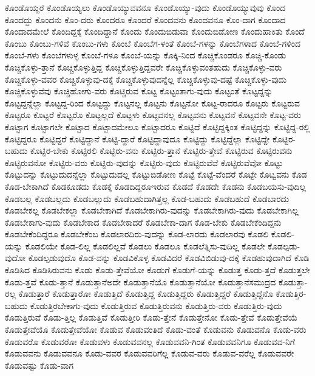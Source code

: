 {ಕೊಂಡೊಯ್ದರೆ
ಕೊಂಡೊಯ್ಯಲು
ಕೊಂಡೊಯ್ಯುವವನೂ
ಕೊಂಡೊಯ್ಯು-ವುದು
ಕೊಂಡೊಯ್ಯುವುವು
ಕೊಂದ
ಕೊಂದದ್ದು
ಕೊಂದನು
ಕೊಂ-ದರು
ಕೊಂದರೂ
ಕೊಂದರೆ
ಕೊಂದವನು
ಕೊಂದವನೂ
ಕೊಂ-ದಾಗ
ಕೊಂದಾದ
ಕೊಂದಾದಮೇಲೆ
ಕೊಂದಿದ್ದಕ್ಕೆ
ಕೊಂದಿದ್ದಾನೆ
ಕೊಂದು
ಕೊಂದುಬಿಡುವಾ
ಕೊಂದುಬಿಡೋಣ
ಕೊಂದುಹಾಕಿತು
ಕೊಂದೆ
ಕೊಂಬು
ಕೊಂಬು-ಗಳಿವೆ
ಕೊಂಬು-ಗಳು
ಕೊಂಬೆ
ಕೊಂಬೆಗ-ಳಂತೆ
ಕೊಂಬೆ-ಗಳನ್ನು
ಕೊಂಬೆಗಳಾದ
ಕೊಂಬೆ-ಗಳಿಂದ
ಕೊಂಬೆ-ಗಳು
ಕೊಂಬೆಗಳುಳ್ಳ
ಕೊಂಬೆ-ಗಳೂ
ಕೊಂಬೆ-ಯನ್ನು
ಕೊಕ್ಕಿ-ನಿಂದ
ಕೊಚ್ಚಿಕೊಂಡರೂ
ಕೊಚ್ಚಿ-ಕೊಂಡು
ಕೊಚ್ಚಿಕೊಳ್ಳು-ತ್ತಾನೆ
ಕೊಚ್ಚಿಕೊಳ್ಳುತ್ತಿದ್ದ
ಕೊಚ್ಚಿಕೊಳ್ಳುತ್ತಿದ್ದವರೇ
ಕೊಚ್ಚಿಕೊಳ್ಳುವಂತಹುದು
ಕೊಚ್ಚಿಕೊಳ್ಳು-ವರು
ಕೊಚ್ಚಿಕೊಳ್ಳು-ವವರ
ಕೊಚ್ಚಿಕೊಳ್ಳುವು-ದಕ್ಕೆ
ಕೊಚ್ಚಿಕೊಳ್ಳುವುದನ್ನೆಲ್ಲ
ಕೊಚ್ಚಿಕೊಳ್ಳುವು-ದಷ್ಟೆ
ಕೊಚ್ಚಿಕೊಳ್ಳು-ವುದು
ಕೊಚ್ಚಿಕೊಳ್ಳುವೆವು
ಕೊಚ್ಚಿಹೋಗು-ವರು
ಕೊಟ್ಚಿರುವ
ಕೊಟ್ಟ
ಕೊಟ್ಟಂತಾಗು-ವುದು
ಕೊಟ್ಟಂತೆ
ಕೊಟ್ಟದ್ದನ್ನು
ಕೊಟ್ಟದ್ದನ್ನೆಲ್ಲಾ
ಕೊಟ್ಟದ್ದ-ರಿಂದ
ಕೊಟ್ಟದ್ದು
ಕೊಟ್ಟನಲ್ಲ
ಕೊಟ್ಟನು
ಕೊಟ್ಟನೋ
ಕೊಟ್ಟ-ರಾದರೂ
ಕೊಟ್ಟರು
ಕೊಟ್ಟರುವ
ಕೊಟ್ಟರೂ
ಕೊಟ್ಟರೆ
ಕೊಟ್ಟರೊ
ಕೊಟ್ಟಲ್ಲದೆ
ಕೊಟ್ಟಳು
ಕೊಟ್ಟವನಲ್ಲ
ಕೊಟ್ಟವನು
ಕೊಟ್ಟವನೆ
ಕೊಟ್ಟವನೇ
ಕೊಟ್ಟ-ವರು
ಕೊಟ್ಟಾಗ
ಕೊಟ್ಟಾಗಲೇ
ಕೊಟ್ಟಾದ
ಕೊಟ್ಟಾದಮೇಲೂ
ಕೊಟ್ಟಾದರೂ
ಕೊಟ್ಟಿದೆ
ಕೊಟ್ಟಿದ್ದಕ್ಕಿಂತ
ಕೊಟ್ಟಿದ್ದನ್ನು
ಕೊಟ್ಟಿದ್ದ-ರಲ್ಲಿ
ಕೊಟ್ಟಿದ್ದರೂ
ಕೊಟ್ಟಿದ್ದರೆ
ಕೊಟ್ಟಿದ್ದಾನೆ
ಕೊಟ್ಟಿ-ದ್ದಾರೆ
ಕೊಟ್ಟಿದ್ದಾವುದೂ
ಕೊಟ್ಟಿದ್ದು
ಕೊಟ್ಟಿದ್ದೆಲ್ಲಾ
ಕೊಟ್ಟಿದ್ದೇ
ಕೊಟ್ಟಿರ-ಬಹುದು
ಕೊಟ್ಟಿರ-ಬೇಕು
ಕೊಟ್ಟಿರಲಿ
ಕೊಟ್ಟಿರು-ವನು
ಕೊಟ್ಟಿರು-ತ್ತಾನೆ
ಕೊಟ್ಟಿರು-ತ್ತೇವೆ
ಕೊಟ್ಟಿರುವ
ಕೊಟ್ಟಿರುವನು
ಕೊಟ್ಟಿರುವನೋ
ಕೊಟ್ಟಿರು-ವರು
ಕೊಟ್ಟಿರು-ವುದನ್ನು
ಕೊಟ್ಟಿರು-ವುದು
ಕೊಟ್ಟಿರುವೆವೆ
ಕೊಟ್ಟಿರುವೆವೋ
ಕೊಟ್ಟು
ಕೊಟ್ಟುದನ್ನು
ಕೊಟ್ಟುದುದನ್ನೆಲ್ಲಾ
ಕೊಟ್ಟುದುದಲ್ಲ
ಕೊಟ್ಟುಬಿಡೋಣ
ಕೊಟ್ಟೆ
ಕೊಟ್ಟೆ-ವೆಂದರೆ
ಕೊಟ್ಟೇ
ಕೊಟ್ವವನು
ಕೊಡ
ಕೊಡ-ಬೇಕಾಗಿದೆ
ಕೊಡಕೂಡದು
ಕೊಡಕ್ಕೆ
ಕೊಡದಿದ್ದರೂಇರುವ
ಕೊಡದೆ
ಕೊಡದೇ
ಕೊಡನು
ಕೊಡಬಯಸು-ವುದಿಲ್ಲ
ಕೊಡಬಲ್ಲ
ಕೊಡಬಲ್ಲದು
ಕೊಡಬಲ್ಲುದು
ಕೊಡಬಹುದಾಗಿತ್ತಲ್ಲ
ಕೊಡ-ಬಹುದು
ಕೊಡಬಹುದೆ
ಕೊಡಬಾರದು
ಕೊಡಬೇಕಲ್ಲ
ಕೊಡಬೇಕಲ್ಲಾ
ಕೊಡಬೇಕಾಗಿದೆ
ಕೊಡಬೇಕಾಗಿರು-ವುದನ್ನು
ಕೊಡಬೇಕಾಗಿರು-ವುದು
ಕೊಡಬೇಕಾಗಿಲ್ಲ
ಕೊಡಬೇಕಾಗು-ವುದು
ಕೊಡಬೇಕಾದ
ಕೊಡಬೇಕಾದರೆ
ಕೊಡಬೇಕಾ-ದಾಗ
ಕೊಡ-ಬೇಕು
ಕೊಡಬೇಕೆಂದಿದ್ದನು
ಕೊಡಬೇಕೆಂದಿದ್ದರೂ
ಕೊಡಬೇಕೆಂಬ
ಕೊಡಲಾರದಿರು-ವುದನ್ನು
ಕೊಡ-ಲಾರದು
ಕೊಡಲಾರವು
ಕೊಡಲಿ
ಕೊಡಲಿ-ಯನ್ನು
ಕೊಡಲಿಯೇ
ಕೊಡ-ಲಿಲ್ಲ
ಕೊಡಲಿಲ್ಲವೆ
ಕೊಡಲು
ಕೊಡಲೂ
ಕೊಡಲೆತ್ನಿಸು-ವುದಿಲ್ಲ
ಕೊಡಲೇ
ಕೊಡಲ್ಪಡು-ವುದೋ
ಕೊಡಲ್ಪಡುವುದೊ
ಕೊಡ-ವನ್ನು
ಕೊಡವಿಕೊಳ್ಳ
ಕೊಡವಿದರೆ
ಕೊಡವಿಬಿಡುವು-ದಕ್ಕೆ
ಕೊಡಹುವುದಾಗಿದೆ
ಕೊಡಿ
ಕೊಡಿಸಿದ
ಕೊಡಿಸಿರುವನು
ಕೊಡು
ಕೊಡು-ತ್ತೇವೆಯೋ
ಕೊಡುಗೆ
ಕೊಡುಗೆ-ಯನ್ನು
ಕೊಡುತ್ತ
ಕೊಡು-ತ್ತದೆ
ಕೊಡುತ್ತಲೇ
ಕೊಡು-ತ್ತವೆ
ಕೊಡು-ತ್ತಾನೆ
ಕೊಡುತ್ತಾನೆಅದೇ
ಕೊಡುತ್ತಾನೆಯೊ
ಕೊಡುತ್ತಾನೆಯೋ
ಕೊಡುತ್ತಾನೆಸಮುದ್ರದ
ಕೊಡುತ್ತಾ-ರಲ್ಲ
ಕೊಡುತ್ತಾರೆ
ಕೊಡುತ್ತಾರೋ
ಕೊಡುತ್ತಿದೆ
ಕೊಡುತ್ತಿದ್ದ
ಕೊಡುತ್ತಿದ್ದರು
ಕೊಡುತ್ತಿದ್ದರೆ
ಕೊಡುತ್ತಿದ್ದೆನೊ
ಕೊಡುತ್ತಿರ-ಬಹುದು
ಕೊಡುತ್ತಿರಬೇಕಾಗು-ವುದು
ಕೊಡುತ್ತಿರುವ
ಕೊಡುತ್ತಿರುವನು
ಕೊಡುತ್ತಿರು-ವರು
ಕೊಡುತ್ತಿರು-ವುದು
ಕೊಡುತ್ತಿರುವೆ
ಕೊಡು-ತ್ತಿಲ್ಲ
ಕೊಡುತ್ತಿವೆ
ಕೊಡುತ್ತೀರಿ
ಕೊಡು-ತ್ತೇನೆ
ಕೊಡುತ್ತೇನೋ
ಕೊಡು-ತ್ತೇವೆ
ಕೊಡುತ್ತೇವೆಯೆ
ಕೊಡುತ್ತೇವೆಯೊ
ಕೊಡುತ್ತೇವೆಯೋ
ಕೊಡುವ
ಕೊಡುವಂತಿದೆ
ಕೊಡು-ವಂತೆ
ಕೊಡುವನು
ಕೊಡುವನೊ
ಕೊಡು-ವರು
ಕೊಡುವರೊ
ಕೊಡುವರೋ
ಕೊಡುವಳು
ಕೊಡುವವನಲ್ಲ
ಕೊಡುವವನಿ-ಗಿಂತ
ಕೊಡುವವನಿಗೂ
ಕೊಡುವವ-ನಿಗೆ
ಕೊಡುವವನು
ಕೊಡುವವನೂ
ಕೊಡು-ವವರ
ಕೊಡುವವರಿಗೆಲ್ಲ
ಕೊಡುವ-ವರು
ಕೊಡುವ-ವರೆಲ್ಲ
ಕೊಡುವವರೇ
ಕೊಡುವಷ್ಟು
ಕೊಡು-ವಾಗ
}
